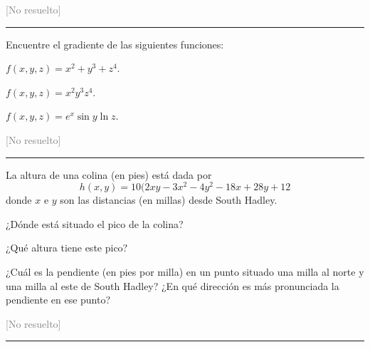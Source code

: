 \begin{ejercicio}
  {\footnotesize \textcolor{gray}{[No resuelto]}}
  \medskip
  {\color{gray}
    \hrule
  }
  
\item Encuentre el gradiente de las siguientes funciones:
  \begin{subejercicio}
  \item $f(x,y,z) = x^2 + y^3 + z^4$.
  \item $f(x,y,z) = x^2 y^3 z^4$.
  \item $f(x,y,z) = e^x \sin y \ln z$.
  \end{subejercicio}
  {\footnotesize \textcolor{gray}{[No resuelto]}}
  \medskip
  {\color{gray}
    \hrule
  }
  
\item La altura de una colina (en pies) está dada por
  \[
    h(x,y) = 10 (2xy - 3x^2 - 4y^2 - 18x + 28y + 12
  \]
  donde $x$ e $y$ son las distancias (en millas) desde South Hadley.
  
  \begin{subejercicio}
  \item ¿Dónde está situado el pico de la colina?
  \item ¿Qué altura tiene este pico?
  \item ¿Cuál es la pendiente (en pies por milla) en un punto situado una
    milla al norte y una milla al este de South Hadley?
    ¿En qué dirección es más pronunciada la pendiente en ese punto?
  \end{subejercicio}
  {\footnotesize \textcolor{gray}{[No resuelto]}}
  \medskip
  {\color{gray}
    \hrule
  }
  

\end{ejercicio}

